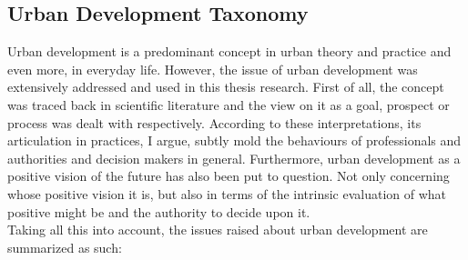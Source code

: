 \documentclass[11pt]{report}
\begin{document}
\subsection{Urban Development Taxonomy}

Urban development is a predominant concept in urban theory and practice and even more, in everyday life.
However, the issue of urban development was extensively addressed and used in this thesis research.
First of all, the concept was traced back in scientific literature and the view on it as a goal, prospect or process was dealt with respectively.
According to these interpretations, its articulation in practices, I argue, subtly mold the behaviours of professionals and authorities and decision makers in general.
Furthermore, urban development as a positive vision of the future has also been put to question.
Not only concerning whose positive vision it is, but also in terms of the intrinsic evaluation of what positive might be and the authority to decide upon it.
\\
Taking all this into account, the issues raised about urban development are summarized as such:
\end{document}
